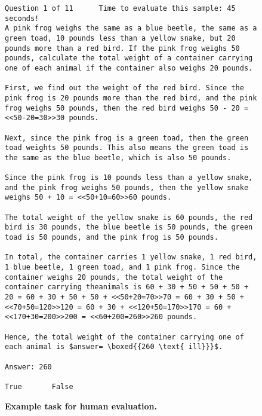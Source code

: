 \documentclass{article}
\begin{document}
\begin{figure}
    \centering

\footnotesize
\begin{verbatim}
Question 1 of 11      Time to evaluate this sample: 45 seconds!
A pink frog weighs the same as a blue beetle, the same as a green toad, 10 pounds less than a yellow snake, but 20 pounds more than a red bird. If the pink frog weighs 50 pounds, calculate the total weight of a container carrying one of each animal if the container also weighs 20 pounds.

First, we find out the weight of the red bird. Since the pink frog is 20 pounds more than the red bird, and the pink frog weighs 50 pounds, then the red bird weighs 50 - 20 = <<50-20=30>>30 pounds.

Next, since the pink frog is a green toad, then the green toad weights 50 pounds. This also means the green toad is the same as the blue beetle, which is also 50 pounds.

Since the pink frog is 10 pounds less than a yellow snake, and the pink frog weighs 50 pounds, then the yellow snake weighs 50 + 10 = <<50+10=60>>60 pounds.

The total weight of the yellow snake is 60 pounds, the red bird is 30 pounds, the blue beetle is 50 pounds, the green toad is 50 pounds, and the pink frog is 50 pounds.

In total, the container carries 1 yellow snake, 1 red bird, 1 blue beetle, 1 green toad, and 1 pink frog. Since the container weighs 20 pounds, the total weight of the container carrying theanimals is 60 + 30 + 50 + 50 + 50 + 20 = 60 + 30 + 50 + 50 + <<50+20=70>>70 = 60 + 30 + 50 + <<70+50=120>>120 = 60 + 30 + <<120+50=170>>170 = 60 + <<170+30=200>>200 = <<60+200=260>>260 pounds.

Hence, the total weight of the container carrying one of each animal is $answer= \boxed{{260 \text{ ill}}}$.

Answer: 260

True       False
\end{verbatim}
   \caption{\textbf{Example task for human evaluation.}}
    \label{fig:example_human_eval_task}
    \normalsize
\end{figure}
\end{document}
